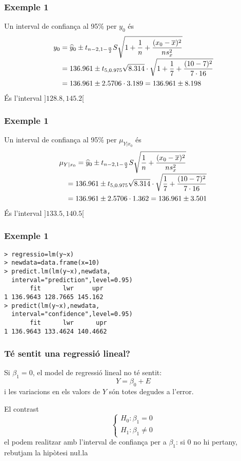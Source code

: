 \documentclass[12pt,t]{beamer}
\theoremstyle{plain}
\theoremstyle{definition}
\begin{document}
\begin{frame}
\frametitle{Exemple 1}
\vspace*{-2ex}


Un interval de confiança al 95\% per $y_0$ és
$$
\begin{array}{l}
\displaystyle
y_0=\widehat{y}_0\pm t_{n-2,1-\frac{\alpha}{2}} S\sqrt{1+\frac{1}{n}+\frac{(x_0-\overline{x})^2}{ns^2_x}}
\\[2ex]
\displaystyle\hphantom{y_0}=136.961\pm t_{5,0.975} \sqrt{8.314}\cdot\sqrt{1+\frac{1}{7}+\frac{(10-7)^2}{7\cdot 16 }}\\[2ex]
\hphantom{y_0} =
136.961\pm 2.5706 \cdot  3.189=136.961\pm  8.198
\end{array}
$$
És l'interval $]128.8,145.2[$

\end{frame}


\begin{frame}
\frametitle{Exemple 1}
\vspace*{-2ex}


Un interval de confiança al 95\% per $\mu_{Y|x_0}$ és
$$
\begin{array}{l}
\displaystyle
\mu_{Y|x_0}=\widehat{y}_0\pm t_{n-2,1-\frac{\alpha}{2}} S\sqrt{\frac{1}{n}+\frac{(x_0-\overline{x})^2}{ns^2_x}}
\\[2ex]
\displaystyle\hphantom{y_0}=136.961\pm t_{5,0.975} \sqrt{8.314}\cdot\sqrt{\frac{1}{7}+\frac{(10-7)^2}{7\cdot 16 }}\\[2ex]
\hphantom{y_0} =
136.961\pm 2.5706 \cdot  1.362=136.961\pm  3.501
\end{array}
$$
És l'interval $]133.5, 140.5[$

\end{frame}


\begin{frame}[fragile]
\frametitle{Exemple 1}
\vspace*{-2ex}

\begin{verbatim}
> regressio=lm(y~x)
> newdata=data.frame(x=10)
> predict.lm(lm(y~x),newdata,
  interval="prediction",level=0.95)
       fit      lwr     upr
1 136.9643 128.7665 145.162
> predict(lm(y~x),newdata,
  interval="confidence",level=0.95)
       fit      lwr      upr
1 136.9643 133.4624 140.4662
\end{verbatim}



\end{frame}

\begin{frame}
\frametitle{Té sentit una regressió lineal?}

Si $\beta_1=0$,  el model de regressió lineal no té sentit:
$$
Y=\beta_0+E
$$
i les variacions en els valors de $Y$ són totes degudes a l'error.
\medskip

El contrast
$$
\left\{\begin{array}{l}
H_0:\beta_1=0\\
H_1:\beta_1 \neq 0
\end{array}
\right.
$$
el podem realitzar amb l'interval de confiança per a $\beta_1$: si 0 no hi pertany, 
rebutjam la hipòtesi nu\l.la
\end{frame}
\end{document}
